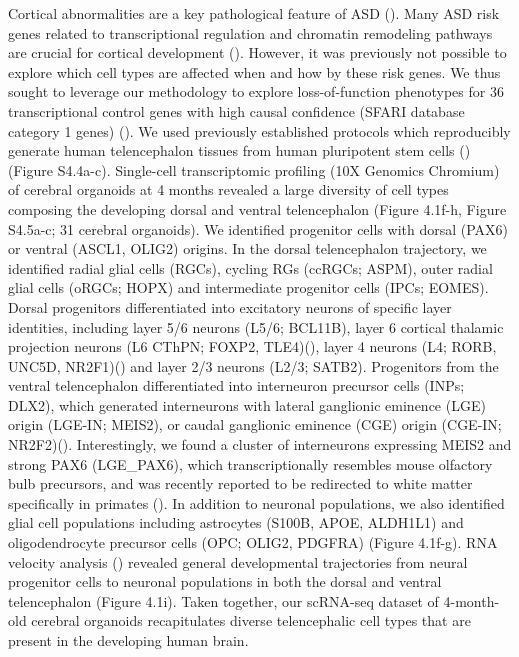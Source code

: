Cortical abnormalities are a key pathological feature of ASD (\cite{torre-ubieta_advancing_2016,chen_emerging_2015}). Many ASD risk genes related to transcriptional regulation and chromatin remodeling pathways are crucial for cortical development (\cite{study_synaptic_2014,trevino_chromatin_2021}). However, it was previously not possible to explore which cell types are affected when and how by these risk genes. We thus sought to leverage our methodology to explore loss-of-function phenotypes for 36 transcriptional control genes with high causal confidence (SFARI database category 1 genes) (\cite{satterstrom_large-scale_2020}).
We used previously established protocols which reproducibly generate human telencephalon tissues from human pluripotent stem cells (\cite{lancaster_cerebral_2013,eichmuller_amplification_2022}) (Figure S4.4a-c). Single-cell transcriptomic profiling (10X Genomics Chromium) of cerebral organoids at 4 months revealed a large diversity of cell types composing the developing dorsal and ventral telencephalon (Figure 4.1f-h, Figure S4.5a-c; 31 cerebral organoids). We identified progenitor cells with dorsal (PAX6) or ventral (ASCL1, OLIG2) origins. In the dorsal telencephalon trajectory, we identified radial glial cells (RGCs), cycling RGs (ccRGCs; ASPM), outer radial glial cells (oRGCs; HOPX) and intermediate progenitor cells (IPCs; EOMES). Dorsal progenitors differentiated into excitatory neurons of specific layer identities, including layer 5/6 neurons (L5/6; BCL11B), layer 6 cortical thalamic projection neurons (L6 CThPN; FOXP2, TLE4)(\cite{tsyporin_transcriptional_2021}),  layer 4 neurons (L4; RORB, UNC5D, NR2F1)(\cite{zhong_identification_2004,oishi_identity_2016}) and layer 2/3 neurons (L2/3; SATB2). Progenitors from the ventral telencephalon differentiated into interneuron precursor cells (INPs; DLX2), which generated interneurons with lateral ganglionic eminence (LGE) origin (LGE-IN; MEIS2), or caudal ganglionic eminence (CGE) origin (CGE-IN; NR2F2)(\cite{shi_mouse_2021}). Interestingly, we found a cluster of interneurons expressing MEIS2 and strong PAX6 (LGE\_PAX6), which transcriptionally resembles mouse olfactory bulb precursors, and was recently reported to be redirected to white matter specifically in primates (\cite{schmitz_development_2022}). In addition to neuronal populations, we also identified glial cell populations including astrocytes (S100B, APOE, ALDH1L1) and oligodendrocyte precursor cells (OPC; OLIG2, PDGFRA) (Figure 4.1f-g). RNA velocity analysis (\cite{manno_rna_2018,bergen_generalizing_2020}) revealed general developmental trajectories from neural progenitor cells to neuronal populations in both the dorsal and ventral telencephalon (Figure 4.1i). Taken together, our scRNA-seq dataset of 4-month-old cerebral organoids recapitulates diverse telencephalic cell types that are present in the developing human brain. 

